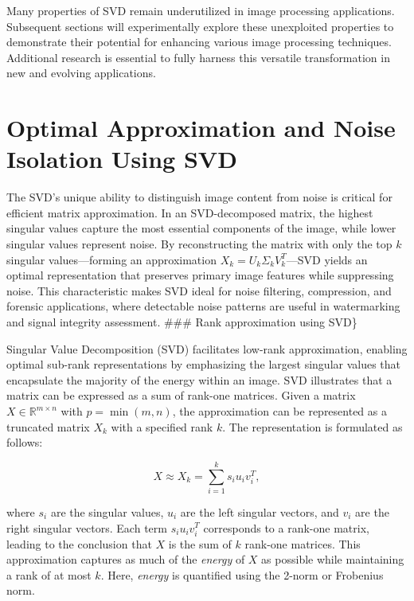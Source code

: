 \documentclass[
  journal,
]{IEEEtran}%
\begin{document}
Many properties of SVD remain underutilized in image processing
applications. Subsequent sections will experimentally explore these
unexploited properties to demonstrate their potential for enhancing
various image processing techniques. Additional research is essential to
fully harness this versatile transformation in new and evolving
applications.

\section{Optimal Approximation and Noise Isolation Using
SVD}\label{optimal-approximation-and-noise-isolation-using-svd}

The SVD's unique ability to distinguish image content from noise is
critical for efficient matrix approximation. In an SVD-decomposed
matrix, the highest singular values capture the most essential
components of the image, while lower singular values represent noise. By
reconstructing the matrix with only the top \(k\) singular
values---forming an approximation \(X_k = U_k \Sigma_k V_k^T\)---SVD
yields an optimal representation that preserves primary image features
while suppressing noise. This characteristic makes SVD ideal for noise
filtering, compression, and forensic applications, where detectable
noise patterns are useful in watermarking and signal integrity
assessment. \#\#\# Rank approximation using SVD\}

Singular Value Decomposition (SVD) facilitates low-rank approximation,
enabling optimal sub-rank representations by emphasizing the largest
singular values that encapsulate the majority of the energy within an
image. SVD illustrates that a matrix can be expressed as a sum of
rank-one matrices. Given a matrix \(X \in \mathbb{R}^{m \times n}\) with
\(p = \min(m,n)\), the approximation can be represented as a truncated
matrix \(X_k\) with a specified rank \(k\). The representation is
formulated as follows:

\[
X \approx X_k = \sum_{i=1}^{k} s_i u_i v_i^T,
\]

where \(s_i\) are the singular values, \(u_i\) are the left singular
vectors, and \(v_i\) are the right singular vectors. Each term
\(s_i u_i v_i^T\) corresponds to a rank-one matrix, leading to the
conclusion that \(X\) is the sum of \(k\) rank-one matrices. This
approximation captures as much of the \emph{energy} of \(X\) as possible
while maintaining a rank of at most \(k\). Here, \emph{energy} is
quantified using the 2-norm or Frobenius norm.
\end{document}
